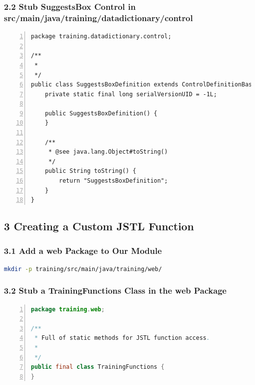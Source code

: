\subsubsection*{2.2 Stub SuggestsBox Control in src/main/java/training/datadictionary/control}
\begin{lstlisting}[basicstyle=\scriptsize,numbers=left,language=xml,backgroundcolor=\color{ubergray},caption={Stubbed
  OJB Descriptor file src/main/resources/OJB-repository-training.xml},frame=single,breaklines=true]
package training.datadictionary.control;

/**
 *
 */
public class SuggestsBoxDefinition extends ControlDefinitionBase {
    private static final long serialVersionUID = -1L;

	public SuggestsBoxDefinition() {
    }

    /**
     * @see java.lang.Object#toString()
     */
    public String toString() {
        return "SuggestsBoxDefinition";
    }
}
\end{lstlisting}

\subsection*{3 Creating a Custom JSTL Function}
\subsubsection*{3.1 Add a web Package to Our Module}

\begin{lstlisting}[basicstyle=\scriptsize,language=bash,backgroundcolor=\color{ubergray},caption={Directory creation for Linux
    users},frame=single,breaklines=true]
  mkdir -p training/src/main/java/training/web/
\end{lstlisting}

\subsubsection*{3.2 Stub a TrainingFunctions Class in the web
  Package}
\begin{lstlisting}[basicstyle=\scriptsize,numbers=left,language=java,backgroundcolor=\color{ubergray},caption={training/web/TrainingFunctions},frame=single,breaklines=true]
package training.web;

/**
 * Full of static methods for JSTL function access.
 * 
 */
public final class TrainingFunctions {
}
\end{lstlisting}


